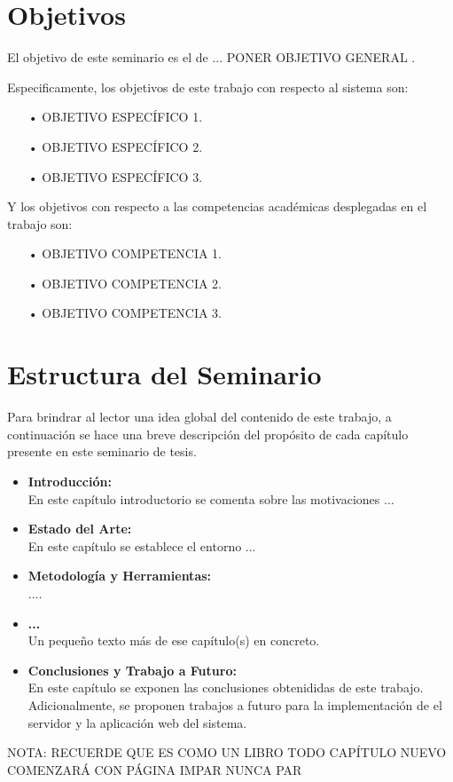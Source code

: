 \section{Objetivos}

El objetivo de este seminario es el de ... PONER OBJETIVO GENERAL .

Especificamente, los objetivos de este trabajo con respecto al sistema son:

\begin{itemize}
\item[•] OBJETIVO ESPECÍFICO 1.
\item[•] OBJETIVO ESPECÍFICO 2.
\item[•] OBJETIVO ESPECÍFICO 3.


\end{itemize}

Y los objetivos con respecto a las competencias académicas desplegadas en el trabajo son:
\begin{itemize}
\item[•] OBJETIVO COMPETENCIA 1.
\item[•] OBJETIVO COMPETENCIA 2.
\item[•] OBJETIVO COMPETENCIA 3.

\end{itemize}

\section{Estructura del Seminario}

Para brindrar al lector una idea global del contenido de este trabajo, a continuación se hace una breve descripción del propósito de cada capítulo presente en este seminario de tesis.
\begin{itemize}

\item \textbf{Introducción:} \\
En este capítulo introductorio se comenta sobre las motivaciones ...

\item \textbf{Estado del Arte:} \\
En este capítulo se establece el entorno ...

\item \textbf{Metodología y Herramientas:} \\
....

\item \textbf{...} \\
Un pequeño texto más de ese capítulo(s) en concreto.

\item \textbf{Conclusiones y Trabajo a Futuro:}\\
En este capítulo se exponen las conclusiones obtenididas de este trabajo. Adicionalmente, se proponen trabajos a futuro para la implementación de el servidor y la aplicación web del sistema.
\end{itemize}

NOTA: RECUERDE QUE ES COMO UN LIBRO TODO CAPÍTULO NUEVO COMENZARÁ CON PÁGINA IMPAR NUNCA PAR


